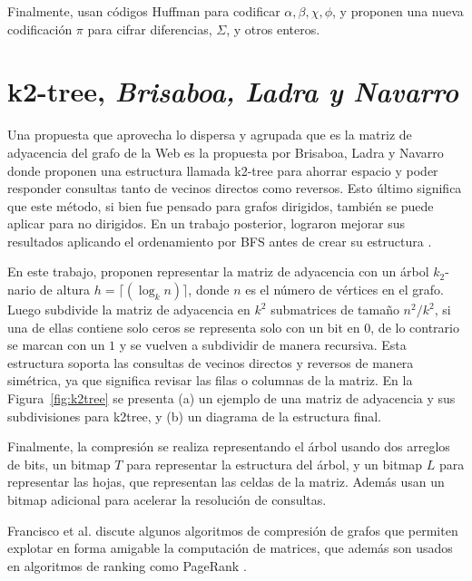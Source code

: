 

Finalmente, usan códigos Huffman para codificar $\alpha, \beta, \chi, \phi$, y proponen una nueva codificación $\pi$ para cifrar diferencias, $\Sigma$, y otros enteros.


\section{k2-tree, \textit{Brisaboa, Ladra y Navarro}}
Una propuesta que aprovecha lo dispersa y agrupada que es la matriz de adyacencia del grafo de la Web es la propuesta por Brisaboa, Ladra y Navarro \cite{brisaboa2009k} donde proponen una estructura llamada k2-tree para ahorrar espacio y poder responder consultas tanto de vecinos directos como reversos. Esto último significa que este método, si bien fue pensado para grafos dirigidos, también se puede aplicar para no dirigidos. En un trabajo posterior, lograron mejorar sus resultados aplicando el ordenamiento por BFS antes de crear su estructura \cite{brisaboa2014compact}.

En este trabajo, proponen representar la matriz de adyacencia con un árbol $k_{2}$-nario de altura $h=\lceil(\log_k n)\rceil$, donde $n$ es el número de vértices en el grafo. Luego subdivide la matriz de adyacencia en $k^2$ submatrices de tamaño $n^{2}/k^{2}$, si una de ellas contiene solo ceros se representa solo con un bit en $0$, de lo contrario se marcan con un $1$ y se vuelven a subdividir de manera recursiva. Esta estructura soporta las consultas de vecinos directos y reversos de manera simétrica, ya que significa revisar las filas o columnas de la matriz. En la Figura~\ref{fig:k2tree} se presenta (a) un ejemplo de una matriz de adyacencia y sus subdivisiones para k2tree, y (b) un diagrama de la estructura final.



Finalmente, la compresión se realiza representando el árbol usando dos arreglos de bits, un bitmap $T$ para representar la estructura del árbol, y un bitmap $L$ para representar las hojas, que representan las celdas de la matriz. Además usan un bitmap adicional para acelerar la resolución de consultas. 


 Francisco et al. \cite{francisco2018exploiting} discute algunos algoritmos de compresión de grafos que permiten explotar en forma amigable la computación de matrices, que además son usados en algoritmos de ranking como PageRank \cite{page1999pagerank}.


